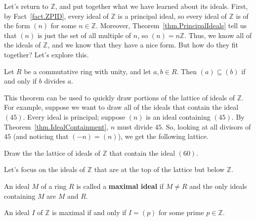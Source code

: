 Let's return to $\mathbb{Z}$, and put together what we have learned about its ideals. First, by Fact~\ref{fact.ZPID}, every ideal of $\mathbb{Z}$ is a principal ideal, so every ideal of $\mathbb{Z}$ is of the form $(n)$ for some $n\in \mathbb{Z}$. Moreover, Theorem~\ref{thm.PrincipalIdeals} tell us that $(n)$ is just the set of all multiple of $n$, so $(n) = n\mathbb{Z}$. Thus, we know all of the ideals of $\mathbb{Z}$, and we know that they have a nice form. But how do they fit together? Let's explore this.

\begin{theorem}\label{thm.IdealContainment}
Let $R$ be a commutative ring with unity, and let $a,b \in R$. Then $(a) \subseteq (b)$ if and only if $b$ divides $a$.
\end{theorem}

This theorem can be used to quickly draw portions of the lattice of ideals of $\mathbb{Z}$. For example, suppose we want to draw all of the ideals that contain the ideal $(45)$. Every ideal is principal; suppose $(n)$ is an ideal containing $(45)$. By Theorem~\ref{thm.IdealContainment}, $n$ must divide $45$. So, looking at all divisors of $45$ (and noticing that $(-n) = (n)$), we get the following lattice. 
\begin{center}
\end{center}

\begin{problem}
Draw the the lattice of ideals of $\mathbb{Z}$ that contain the ideal $(60)$.
\end{problem}

Let's focus on the ideals of $\mathbb{Z}$ that are at the top of the lattice but below $\mathbb{Z}$.

\begin{definition}
An ideal $M$ of a ring $R$ is called a \textbf{maximal ideal} if $M\neq R$ and the only ideals containing $M$ are $M$ and $R$.
\end{definition}

\begin{theorem}
An ideal $I$ of $\mathbb{Z}$ is maximal if and only if $I=(p)$ for some prime $p\in \mathbb{Z}$.
\end{theorem}

